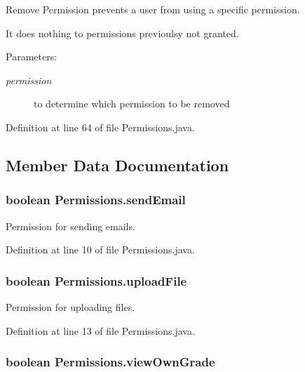 Remove Permission prevents a user from using a specific permission. 

It does nothing to permissions previoulsy not granted. \begin{Desc}
\item[Parameters:]
\begin{description}
\item[{\em permission}]to determine which permission to be removed \end{description}
\end{Desc}


Definition at line 64 of file Permissions.java.

\subsection{Member Data Documentation}
\hypertarget{classPermissions_04adc389970c51020670fe42a8760d8b}{
\subsubsection{\setlength{\rightskip}{0pt plus 5cm}boolean {\bf Permissions.sendEmail}}}
\label{classPermissions_04adc389970c51020670fe42a8760d8b}


Permission for sending emails. 



Definition at line 10 of file Permissions.java.\hypertarget{classPermissions_8621c8bad77f0aa3eaf7aaeb963253cc}{
\subsubsection{\setlength{\rightskip}{0pt plus 5cm}boolean {\bf Permissions.uploadFile}}}
\label{classPermissions_8621c8bad77f0aa3eaf7aaeb963253cc}


Permission for uploading files. 



Definition at line 13 of file Permissions.java.\hypertarget{classPermissions_7a2909f11c0dd0e9536acda794b1fce5}{
\subsubsection{\setlength{\rightskip}{0pt plus 5cm}boolean {\bf Permissions.viewOwnGrade}}}
\label{classPermissions_7a2909f11c0dd0e9536acda794b1fce5}


